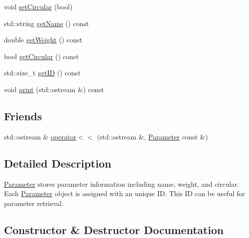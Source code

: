 \begin{DoxyCompactItemize}
\item 
void \mbox{\hyperlink{classanen_par_1_1_parameter_a77543a69497a6da692c76707207a6562}{set\+Circular}} (bool)
\item 
std\+::string \mbox{\hyperlink{classanen_par_1_1_parameter_aedb83bcd926fb8df7dc5ee31a1066baa}{get\+Name}} () const
\item 
double \mbox{\hyperlink{classanen_par_1_1_parameter_a2fcb32200dafaa276b7a1ca61f135f72}{get\+Weight}} () const
\item 
bool \mbox{\hyperlink{classanen_par_1_1_parameter_a8f0f2e92941e8bbae49de6388c87fdf8}{get\+Circular}} () const
\item 
std\+::size\+\_\+t \mbox{\hyperlink{classanen_par_1_1_parameter_a12c2b322265422eea431043dd50f047d}{get\+ID}} () const
\item 
void \mbox{\hyperlink{classanen_par_1_1_parameter_a93bd0debbfe144b2c1dd68aca79adfb2}{print}} (std\+::ostream \&) const
\end{DoxyCompactItemize}
\subsection*{Friends}
\begin{DoxyCompactItemize}
\item 
std\+::ostream \& \mbox{\hyperlink{classanen_par_1_1_parameter_a062fa105b64c362071304bc5f2eb350a}{operator$<$$<$}} (std\+::ostream \&, \mbox{\hyperlink{classanen_par_1_1_parameter}{Parameter}} const \&)
\end{DoxyCompactItemize}


\subsection{Detailed Description}
\mbox{\hyperlink{classanen_par_1_1_parameter}{Parameter}} stores parameter information including name, weight, and circular. Each \mbox{\hyperlink{classanen_par_1_1_parameter}{Parameter}} object is assigned with an unique ID. This ID can be useful for parameter retrieval. 

\subsection{Constructor \& Destructor Documentation}
\mbox{\label{classanen_par_1_1_parameter_a5ba93ca36c3261d3850e67f92717c2f5}} 
